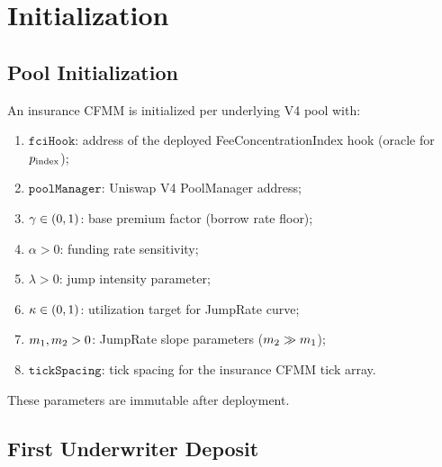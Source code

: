 
\section{Initialization}\label{sec:initialization}

\subsection{Pool Initialization}

\begin{definition}\label{def:init-params}
An insurance CFMM is initialized per underlying V4 pool with:
\begin{enumerate}[label=(\roman*)]
  \item $\texttt{fciHook}$: address of the deployed FeeConcentrationIndex hook
    (oracle for $p_{\text{index}}$);
  \item $\texttt{poolManager}$: Uniswap V4 PoolManager address;
  \item $\gamma \in (0, 1)$: base premium factor (borrow rate floor);
  \item $\alpha > 0$: funding rate sensitivity;
  \item $\lambda > 0$: jump intensity parameter;
  \item $\kappa \in (0, 1)$: utilization target for JumpRate curve;
  \item $m_1, m_2 > 0$: JumpRate slope parameters ($m_2 \gg m_1$);
  \item $\texttt{tickSpacing}$: tick spacing for the insurance CFMM tick array.
\end{enumerate}
These parameters are immutable after deployment.
\end{definition}

\subsection{First Underwriter Deposit}

